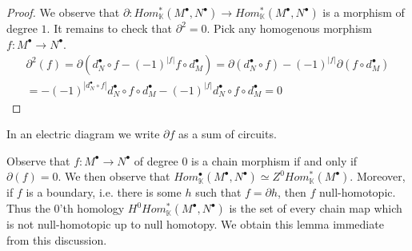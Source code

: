 \documentclass[../thesis.tex]{subfiles}
\begin{document}
            \begin{proof}
                We observe that $\partial : Hom_{\mathbb{K}}^*(M^{\bullet},N^{\bullet}) \rightarrow Hom_{\mathbb{K}}^*(M^{\bullet},N^{\bullet})$ is a morphism of degree $1$. It remains to check that $\partial^2 = 0$. Pick any homogenous morphism $f : M^{\bullet}\rightarrow N^{\bullet}$.
                \begin{multline*}
                    \partial^2(f) = \partial(d_N^{\bullet}\circ f - (-1)^{|f|}f\circ d_M^{\bullet}) = \partial(d_N^{\bullet}\circ f) - (-1)^{|f|}\partial(f\circ d_M^{\bullet}) \\ = - (-1)^{|d_N^{\bullet}\circ f|}d_N^{\bullet}\circ f\circ d_M^{\bullet} - (-1)^{|f|}d_N^{\bullet}\circ f\circ d_M^{\bullet} = 0
                \end{multline*}
            \end{proof}

            In an electric diagram we write $\partial f$ as a sum of circuits.
            \begin{center}
            \end{center}

            Observe that $f:M^{\bullet}\rightarrow N^{\bullet}$ of degree $0$ is a chain morphism if and only if $\partial(f) = 0$. We then observe that $Hom_{\mathbb{K}}^{\bullet}(M^{\bullet},N^{\bullet})\simeq Z^0Hom_{\mathbb{K}}^*(M^{\bullet})$. Moreover, if $f$ is a boundary, i.e. there is some $h$ such that $f = \partial h$, then $f$ null-homotopic. Thus the $0$'th homology $H^0Hom^*_\mathbb{K}(M^\bullet, N^\bullet)$ is the set of every chain map which is not null-homotopic up to null homotopy. We obtain this lemma immediate from this discussion.
\end{document}
